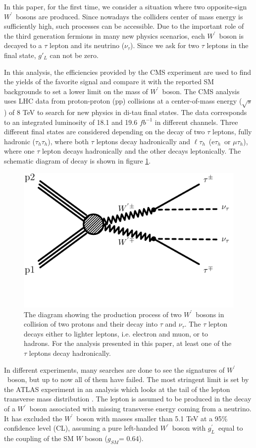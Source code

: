 \documentclass[preprint,showpacs,preprintnumbers]{revtex4}
\newcommand{\wprime}{\ensuremath{W^\prime}~}
\newcommand{\Tau}{\ensuremath{\tau_h}}
\newcommand{\tauTau}{\ensuremath{\tau_h\tau_h}}
\newcommand{\lepTau}{\ensuremath{\ell\tau_h}}
\newcommand{\gL}{\ensuremath{g^\prime_L}}
\newcommand{\gSM}{\ensuremath{g_{\scriptscriptstyle SM}}}
\begin{document}
In this paper, for the first time, we consider a situation where two opposite-sign \wprime bosons are produced. Since nowadays the colliders center of mass energy is sufficiently high, such processes can be accessible. Due to the important role of the third generation fermions in many new physics scenarios, each \wprime boson is decayed to a $\tau$ lepton and its neutrino ($\nu_{\tau}$). Since we ask for two $\tau$ leptons in the final state, $g'_L$ can not be zero. 

In this analysis, the efficiencies provided by the CMS experiment \cite{Khachatryan:2016trj} are used to find the yields of the favorite signal and compare it with the reported SM backgrounds to set a lower limit on the mass of \wprime boson. 
The CMS analysis uses LHC data from proton-proton (pp) collisions at a center-of-mass energy ($\sqrt{s}$) of 8 TeV to search for new physics in di-tau final states.  The data corresponds to an integrated luminosity of 18.1 and 19.6 $fb^{-1}$ in different channels. Three different final states are considered depending on the decay of two $\tau$ leptons, fully hadronic (\tauTau), where both $\tau$ leptons decay hadronically and \lepTau  ~(e\Tau ~or $\mu\Tau$), where one $\tau$ lepton decays hadronically and the other decays leptonically. The schematic diagram of decay is shown in figure \ref{fig:wprimefeyndiagram}.
\begin{figure}[!htb]
	\includegraphics*[width=.45\textwidth]{WpWpTauTau.pdf}
	\caption{The diagram showing the production process of two \wprime bosons in collision of two protons and their decay into $\tau$ and $\nu_{\tau}$. The $\tau$ lepton decays either to lighter leptons, i.e. electron and muon, or to hadrons. For the analysis presented in this paper, at least one of the $\tau$ leptons decay hadronically.}
	\label{fig:wprimefeyndiagram}
\end{figure}

In different experiments, many searches are done to see the signatures of \wprime boson, but up to now all of them have failed. The most stringent limit is set by the ATLAS experiment in an analysis which looks at the tail of the lepton transverse mass distribution \cite{Aaboud:2017efa}. The lepton is assumed to be produced in the decay of a \wprime boson associated with missing transverse energy coming from a neutrino. It has excluded the \wprime boson with masses smaller than 5.1 TeV at a 95\% confidence level (CL), assuming a pure left-handed \wprime boson with \gL ~equal to the coupling of the SM $W$ boson (\gSM = 0.64). 
\end{document}
